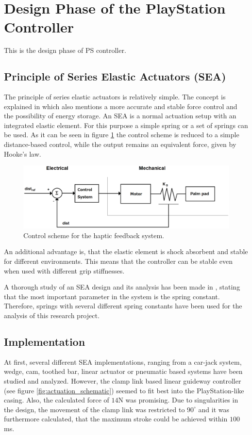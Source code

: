 \section{Design Phase of the PlayStation Controller}
This is the design phase of PS controller.

\subsection{Principle of Series Elastic Actuators (SEA)}
The principle of series elastic actuators is relatively simple. The concept is explained in \cite{Pratt1995} which also mentions a more accurate and stable force control and the possibility of energy storage. An SEA is a normal actuation setup with an integrated elastic element. For this purpose a simple spring or a set of springs can be used. As it can be seen in figure \ref{fig:control_scheme} the control scheme is reduced to a simple distance-based control, while the output remains an equivalent force, given by Hooke's law.\\

\begin{figure}[h!]
	\centering
	\includegraphics[width=0.7\linewidth]{Figs/control_scheme}
	\caption{Control scheme for the haptic feedback system.}
	\label{fig:control_scheme}
\end{figure}

An additional advantage is, that the elastic element is shock absorbent and stable for different environments. This means that the controller can be stable even when used with different grip stiffnesses.

A thorough study of an SEA design and its analysis has been made in \cite{Junior2016}, stating that the most important parameter in the system is the spring constant. Therefore, springs with several different spring constants have been used for the analysis of this research project.\\

\subsection{Implementation}
At first, several different SEA implementations, ranging from a car-jack system, wedge, cam, toothed bar, linear actuator or pneumatic based systems have been studied and analyzed. However, the clamp link based linear guideway controller (see figure \ref{fig:actuation_schematic}) seemed to fit best into the PlayStation-like casing. Also, the calculated force of $14$N was promising. Due to singularities in the design, the movement of the clamp link was restricted to $90^\circ$ and it was furthermore calculated, that the maximum stroke could be achieved within $100$ms.

